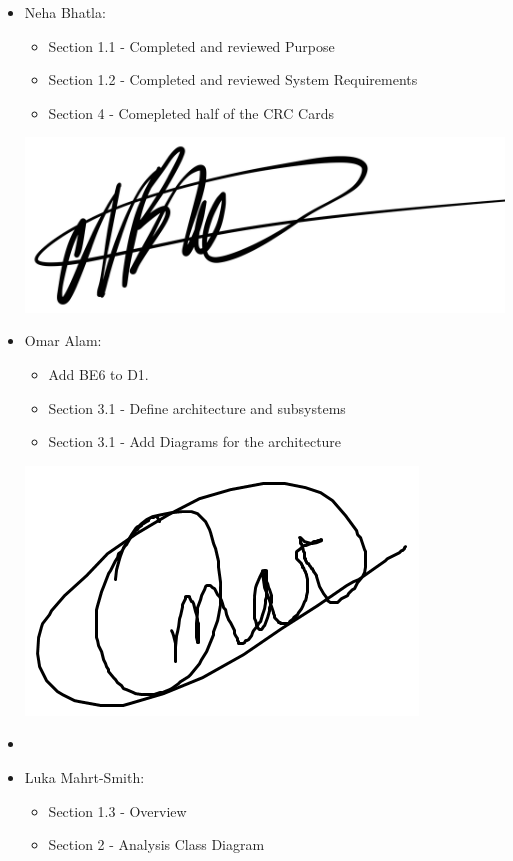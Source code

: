 \documentclass[]{article}
\begin{document}
\begin{itemize}
	\item Neha Bhatla:
	\begin{itemize} 
		\item Section 1.1 - Completed and reviewed Purpose
		\item Section 1.2 - Completed and reviewed System Requirements
		\item Section 4 - Comepleted half of the CRC Cards
	\end{itemize}
	\includegraphics[scale=0.1]{neha_signature.jpeg}\\ 
	\item Omar Alam:
	\begin{itemize}
		\item Add BE6 to D1.
		\item Section 3.1 - Define architecture and subsystems
		\item Section 3.1 - Add Diagrams for the architecture
	\end{itemize}
	\includegraphics[scale=0.3]{omar-signature.png}\\
	\item \begin{itemize} \end{itemize}
	\item Luka Mahrt-Smith:
	\begin{itemize}
		\item Section 1.3 - Overview
		\item Section 2 - Analysis Class Diagram

\end{itemize}
\end{itemize}
\end{document}
